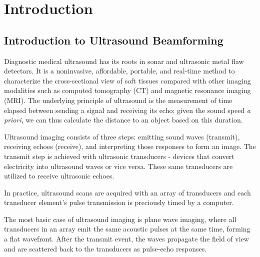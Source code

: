 \chapter{Introduction}


\section{Introduction to Ultrasound Beamforming}
 Diagnostic medical ultrasound has its roots in sonar and ultrasonic metal flaw detectors. It is a noninvasive, affordable, portable, and real-time method to characterize the cross-sectional view of soft tissues compared with other imaging modalities such as computed tomography (CT) and magnetic resonance imaging (MRI). The underlying principle of ultrasound is the measurement of time elapsed between sending a signal and receiving its echo; given the sound speed \textit{a priori}, we can thus calculate the distance to an object based on this duration.

 Ultrasound imaging consists of three steps: emitting sound waves (transmit), receiving echoes (receive), and interpreting those responses to form an image. The transmit step is achieved with ultrasonic transducers - devices that convert electricity into ultrasound waves or vice versa. These same transducers are utilized to receive ultrasonic echoes.

 In practice, ultrasound scans are acquired with an array of transducers and each transducer element's pulse transmission is preciously timed by a computer. %

 The most basic case of ultrasound imaging is plane wave imaging, where all transducers in an array emit the same acoustic pulses at the same time, forming a flat wavefront. After the transmit event, the waves propagate the field of view and are scattered back to the transducers as pulse-echo responses.



